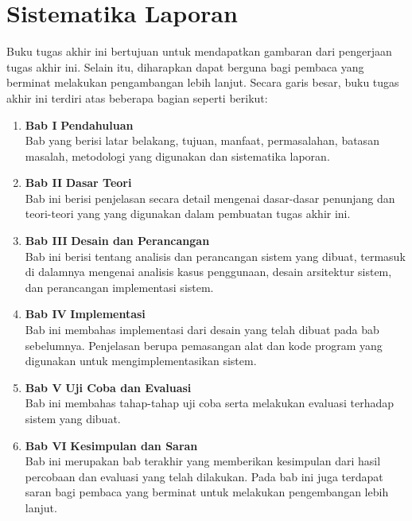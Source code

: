 \section{Sistematika Laporan}
Buku tugas akhir ini bertujuan untuk mendapatkan gambaran dari pengerjaan tugas akhir ini. Selain itu, diharapkan dapat berguna bagi pembaca yang berminat melakukan pengambangan lebih lanjut. Secara garis besar, buku tugas akhir ini terdiri atas beberapa bagian seperti berikut:
\begin{enumerate}
	
	\item \textbf{Bab I} \indent \textbf{Pendahuluan} \\        
	\indent \indent Bab yang berisi latar belakang, tujuan, manfaat, permasalahan, batasan masalah, metodologi yang digunakan dan sistematika laporan.
	\\
	\item \textbf{Bab II} \indent \textbf{Dasar Teori}
	\\
	\indent \indent Bab ini berisi penjelasan secara detail mengenai dasar-dasar penunjang dan teori-teori yang yang digunakan dalam pembuatan tugas akhir ini.
	\\
	\item \textbf{Bab III} \indent \textbf{Desain dan Perancangan}
	\\
	\indent \indent Bab ini berisi tentang analisis dan perancangan sistem yang dibuat, termasuk di dalamnya mengenai analisis kasus penggunaan, desain arsitektur sistem, dan perancangan implementasi sistem.
	\\
	\item \textbf{Bab IV} \indent \textbf{Implementasi}
	\\
	\indent \indent Bab ini membahas implementasi dari desain yang telah dibuat pada bab sebelumnya. Penjelasan berupa pemasangan alat dan kode program yang digunakan untuk mengimplementasikan sistem.
	\\
	\item \textbf{Bab V} \indent \textbf{Uji Coba dan Evaluasi}
	\\
	\indent \indent Bab ini membahas tahap-tahap uji coba serta melakukan evaluasi terhadap sistem yang dibuat.
	\\
	\item \textbf{Bab VI} \indent \textbf{Kesimpulan dan Saran}
	\\
	\indent \indent Bab ini merupakan bab terakhir yang memberikan kesimpulan dari hasil percobaan dan evaluasi yang telah dilakukan. Pada bab ini juga terdapat saran bagi pembaca yang berminat untuk melakukan pengembangan lebih lanjut.    
\end{enumerate}
